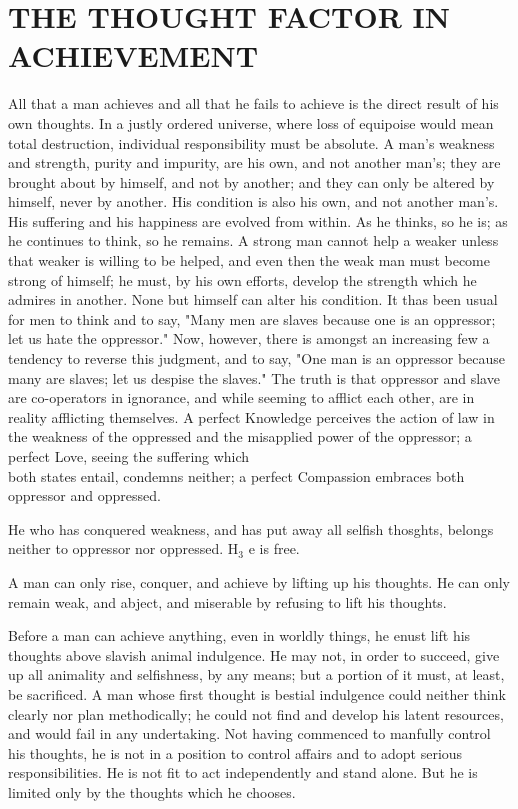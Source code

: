 \documentclass[10pt]{article}
\begin{document}
\section*{THE THOUGHT FACTOR IN ACHIEVEMENT}
All that a man achieves and all that he fails to achieve is the direct result of his own thoughts. In a justly ordered universe, where loss of equipoise would mean total destruction, individual responsibility must be absolute. A man's weakness and strength, purity and impurity, are his own, and not another man's; they are brought about by himself, and not by another; and they can only be altered by himself, never by another. His condition is also his own, and not another man's. His suffering and his happiness are evolved from within. As he thinks, so he is; as he continues to think, so he remains. A strong man cannot help a weaker unless that weaker is willing to be helped, and even then the weak man must become strong of himself; he must, by his own efforts, develop the strength which he admires in another. None but himself can alter his condition. It thas been usual for men to think and to say, "Many men are slaves because one is an oppressor; let us hate the oppressor." Now, however, there is amongst an increasing few a tendency to reverse this judgment, and to say, "One man is an oppressor because many are slaves; let us despise the slaves." The truth is that oppressor and slave are co-operators in ignorance, and while seeming to afflict each other, are in reality afflicting themselves. A perfect Knowledge perceives the action of law in the weakness of the oppressed and the misapplied power of the oppressor; a perfect Love, seeing the suffering which\\
both states entail, condemns neither; a perfect Compassion embraces both oppressor and oppressed.

He who has conquered weakness, and has put away all selfish thosghts, belongs neither to oppressor nor oppressed. $\mathrm{H}_{3}$ e is free.

A man can only rise, conquer, and achieve by lifting up his thoughts. He can only remain weak, and abject, and miserable by refusing to lift his thoughts.

Before a man can achieve anything, even in worldly things, he enust lift his thoughts above slavish animal indulgence. He may not, in order to succeed, give up all animality and selfishness, by any means; but a portion of it must, at least, be sacrificed. A man whose first thought is bestial indulgence could neither think clearly nor plan methodically; he could not find and develop his latent resources, and would fail in any undertaking. Not having commenced to manfully control his thoughts, he is not in a position to control affairs and to adopt serious responsibilities. He is not fit to act independently and stand alone. But he is limited only by the thoughts which he chooses.
\end{document}
